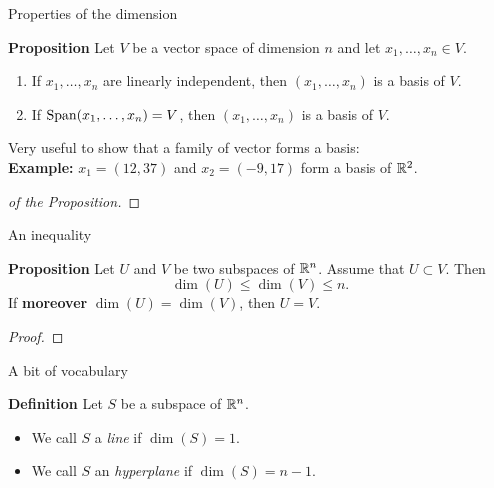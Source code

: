 \documentclass{beamer}
\begin{document}
\begin{frame}[t]{Properties of the dimension}
	\vspace{-0.3cm}
	\begin{block}{\bf Proposition}
		Let $V$ be a vector space of dimension $n$ and let $x_1, \dots, x_n \in V$.
		\begin{enumerate}
			\item If $x_1, \dots, x_n$ are linearly independent, then $(x_1, \dots, x_n)$ is a basis of $V$.
			\item If ${{\rm Span}}(x_1, \dots, x_n) = V$, then $(x_1, \dots, x_n)$ is a basis of $V$.
		\end{enumerate}
	\end{block}

	\vspace{0.3cm}

	Very useful to show that a family of vector forms a basis:
	\\
	\vspace{0.3cm}
	\textbf{Example:} $x_1 = (12,37)$ and $x_2 = (-9,17)$ form a basis of $\mathbb{R}^2$.

	\vspace{1.9cm}

	\begin{proof}[of the Proposition]
	\end{proof}
\end{frame}

\begin{frame}[t]{An inequality}
	\vspace{-0.4cm}
	\begin{block}{\bf Proposition}
		Let	$U$ and $V$ be two subspaces of $\mathbb{R}^n$. Assume that $U \subset V$. Then
		$$
		\dim(U) \leq \dim(V) \leq n.
		$$
		If \textbf{moreover} $\dim(U) = \dim(V)$, then $U = V$.
	\end{block}
	\pause
	\begin{proof}
		\vspace{3.5cm}
		\vfill
	\end{proof}
\end{frame}

\begin{frame}[t]{A bit of vocabulary}
	\vspace{-0.4cm}
	\begin{block}{\bf Definition}
		Let $S$ be a subspace of $\mathbb{R}^n$.
		\begin{itemize}
			\item We call $S$ a \emph{line} if $\dim(S) = 1$.
			\item We call $S$ an \emph{hyperplane} if $\dim(S) = n-1$.
		\end{itemize}
	\end{block}
\end{frame}
\end{document}
